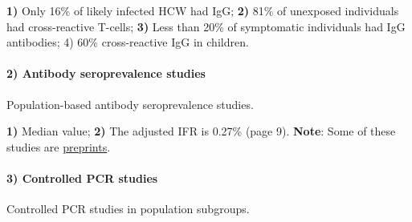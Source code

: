 \textbf{1)} Only 16\% of likely infected HCW had IgG; \textbf{2)} 81\%
of unexposed individuals had cross-reactive T-cells; \textbf{3)} Less
than 20\% of symptomatic individuals had IgG antibodies; 4) 60\%
cross-reactive IgG in children.

\hypertarget{2-antibody-seroprevalence-studies}{%
\paragraph{2) Antibody seroprevalence
studies}\label{2-antibody-seroprevalence-studies}}

Population-based antibody seroprevalence studies.

\textbf{1)} Median value; \textbf{2)} The adjusted IFR is 0.27\% (page
9). \textbf{Note}: Some of these studies are
\href{https://www.medrxiv.org/content/what-unrefereed-preprint}{preprints}.

\hypertarget{3-controlled-pcr-studies}{%
\paragraph{3) Controlled PCR studies}\label{3-controlled-pcr-studies}}

Controlled PCR studies in population subgroups.

